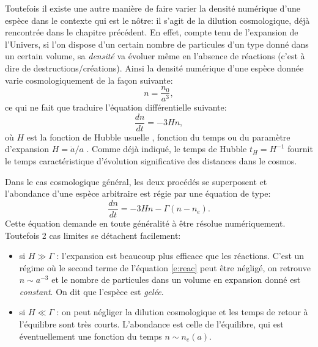 Toutefois il existe une autre manière de faire varier la densité numérique d'une espèce dans le contexte qui est le nôtre: il s'agit de la dilution cosmologique, déjà rencontrée dans le chapitre précédent. En effet, compte tenu de l'expansion de l'Univers, si l'on dispose d'un certain nombre de particules d'un type donné dans un certain volume, sa \textit{densité} va évoluer même en l'absence de réactions (c'est à dire de destructions/créations). Ainsi la densité numérique d'une espèce donnée varie cosmologiquement de la façon suivante:
\begin{equation}
n=\frac{n_0}{a^3},
\end{equation}
ce qui ne fait que traduire l'équation différentielle suivante:
\begin{equation}
\frac{dn}{dt}=-3Hn,
\end{equation}
où $H$ est la fonction de Hubble usuelle , fonction du temps ou du paramètre d'expansion $H=\dot a/a$ . Comme déjà indiqué, le temps de Hubble $t_H=H^{-1}$ fournit le temps caractéristique d'évolution significative des distances dans le cosmos.

Dans le cas cosmologique général, les deux procédés se superposent et l'abondance d'une espèce arbitraire est régie par une équation de type:
\begin{equation}
\frac{dn}{dt}=-3Hn-\Gamma (n-n_e).
\label{e:reac}
\end{equation}
Cette équation demande en toute généralité à être résolue numériquement. Toutefois 2 cas limites se détachent facilement:
\begin{itemize}
\item si $H\gg \Gamma$ : l'expansion est beaucoup plus efficace que les réactions. C'est un régime où le second terme de l'équation \ref{e:reac} peut être négligé, on retrouve $n\sim a^{-3}$ et le nombre de particules dans un volume en expansion donné est \textit{constant}. On dit que l'espèce est \textit{gelée}.
\item si $H\ll \Gamma$ : on peut négliger la dilution cosmologique et les temps de retour à l'équilibre sont très courts. L'abondance est celle de l'équilibre, qui est éventuellement une fonction du temps $n\sim n_e(a)$.
\end{itemize}

